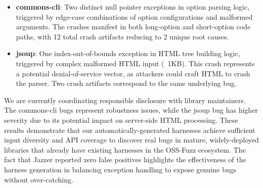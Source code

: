 \begin{itemize}
\item \textbf{commons-cli}: Two distinct null pointer exceptions in option parsing logic, triggered by edge-case combinations of option configurations and malformed arguments. The crashes manifest in both long-option and short-option code paths, with 12 total crash artifacts reducing to 2 unique root causes.
\item \textbf{jsoup}: One index-out-of-bounds exception in HTML tree building logic, triggered by complex malformed HTML input (~1KB). This crash represents a potential denial-of-service vector, as attackers could craft HTML to crash the parser. Two crash artifacts correspond to the same underlying bug.
\end{itemize}

We are currently coordinating responsible disclosure with library maintainers. The commons-cli bugs represent robustness issues, while the jsoup bug has higher severity due to its potential impact on server-side HTML processing.
These results demonstrate that our automatically-generated harnesses achieve sufficient input diversity and API coverage to discover real bugs in mature, widely-deployed libraries that already have existing harnesses in the OSS-Fuzz ecosystem. The fact that Jazzer reported zero false positives highlights the effectiveness of the harness generation in balancing exception handling to expose genuine bugs without over-catching.
%
